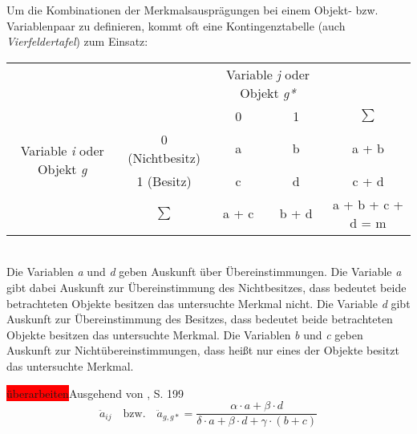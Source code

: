 Um die Kombinationen der Merkmalsausprägungen bei einem Objekt- bzw. Variablenpaar zu definieren, kommt oft eine Kontingenztabelle (auch \textit{Vierfeldertafel}) zum Einsatz: \\

\begin{tabular}{cc|cc|c}
	& & \multicolumn{2}{c|}{Variable \textit{j} oder Objekt \textit{g*}} & \\ 
	& & 0 & 1 & $\sum$ \\ \hline
	\multirow{2}{*}{Variable \textit{i} oder Objekt \textit{g}} & 0 (Nichtbesitz) & a & b & a + b \\
	& 1 (Besitz) & c & d & c + d \\ \hline
	& $\sum$ & a + c & b + d & a + b + c + d = m \\ 
\end{tabular}
\bigskip
\\
Die Variablen \textit{a} und \textit{d} geben Auskunft über Übereinstimmungen. Die Variable \textit{a} gibt dabei Auskunft zur Übereinstimmung des Nichtbesitzes, dass bedeutet beide betrachteten Objekte besitzen das untersuchte Merkmal nicht. Die Variable \textit{d} gibt Auskunft zur Übereinstimmung des Besitzes, dass bedeutet beide betrachteten Objekte besitzen das untersuchte Merkmal. Die Variablen \textit{b} und \textit{c} geben Auskunft zur Nichtübereinstimmungen, dass heißt nur eines der Objekte besitzt das untersuchte Merkmal.

\colorbox{red}{überarbeiten}Ausgehend von \cite{Bacher.2010}, S. 199
\begin{equation}
\ddot{a}_{ij} \quad \text{bzw.} \quad \ddot{a}_{g,g*} = \frac{\alpha \cdot a + \beta \cdot d}{\delta \cdot a + \beta \cdot d + \gamma \cdot (b + c)}
\end{equation}

